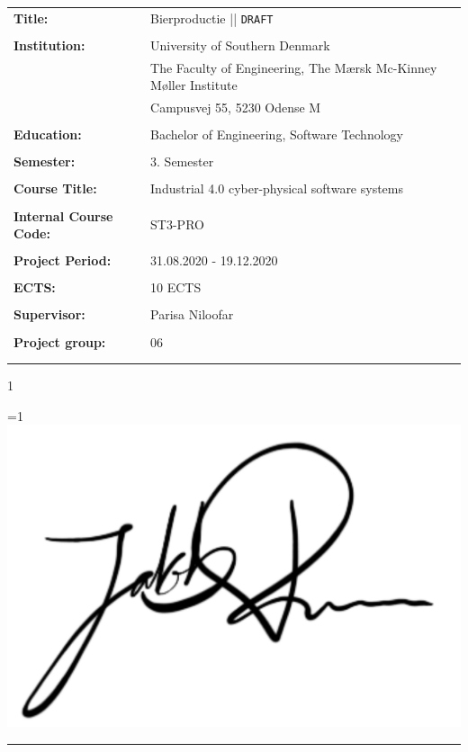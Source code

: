 \begin{tabular}{@{}l l} 
\textbf{Title:} & Bierproductie || \texttt{DRAFT}\\
& \\
\textbf{Institution:} & University of Southern Denmark \\
& The Faculty of Engineering, The Mærsk Mc-Kinney Møller Institute \\
& Campusvej 55, 5230 Odense M \\
& \\
\textbf{Education:} & Bachelor of Engineering, Software Technology\\
& \\
\textbf{Semester:} & 3. Semester \\
& \\
\textbf{Course Title:} & Industrial 4.0 cyber-physical software systems \\
& \\
\textbf{Internal Course Code:} & ST3-PRO \\
& \\
\textbf{Project Period:} &  31.08.2020 - 19.12.2020\\
& \\
\textbf{ECTS:} & 10 ECTS\\
& \\
\textbf{Supervisor:} & Parisa Niloofar\\
& \\
\textbf{Project group:} & 06\\
& \\

\\
\end{tabular}

\setcounter{PROD} {1}



\ifnum \value{PROD}=1
    \includegraphics[scale=0.07]{images/signatures/signatureJR.jpg}
    \vspace{-9.5mm}
\fi
\par\rule{\textwidth}{0.4pt}

